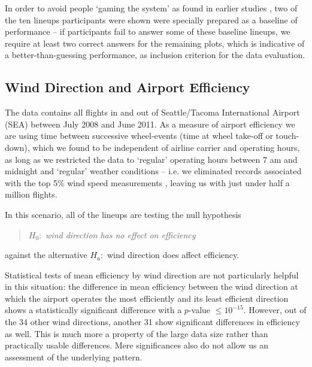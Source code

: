  In order to avoid people `gaming the system' as found in earlier studies \cite{heer:2010, kosara:2010}, two of the ten lineups participants were shown were specially prepared as a baseline of performance -- if participants fail to answer some of these baseline lineups, we require at least two correct answers for the remaining plots, which is indicative of a better-than-guessing performance, as inclusion criterion for the data evaluation. 

\subsection{Wind Direction and Airport Efficiency}

The data contains all flights \cite{rita} in and out of Seattle/Tacoma International Airport (SEA) between July 2008 and June 2011. As a measure of airport efficiency we are using time between successive wheel-events (time at wheel take-off or touch-down), which we found to be independent of airline carrier and operating hours, as long as we restricted the data to `regular' operating hours between 7 am and midnight and `regular' weather conditions -- i.e. we eliminated records associated with the top 5\% wind speed measurements \cite{noaa-weather}, leaving us with just under half a million flights.

In this scenario, all of the lineups are testing the null hypothesis 

\vspace{-0.1in}
\begin{quote}
$H_0: $ {\em wind direction has no effect on efficiency }
\end{quote}
\vspace{-0.1in}

\noindent against the alternative $H_a:$ wind direction does affect efficiency.

Statistical tests of mean efficiency by wind direction are not particularly helpful in this situation: the difference in mean efficiency between the  wind direction at which the airport operates the most efficiently and its least efficient direction shows a statistically significant difference with a $p$-value $\le 10^{-15}$. %
However, out of the 34 other wind directions,  another 31 show significant differences in efficiency as well. This is much more a property of the large data size rather than practically usable differences. Mere significances also do not allow us an assessment of the underlying pattern.

